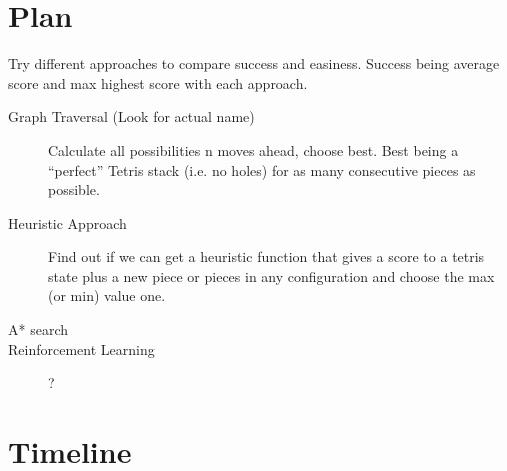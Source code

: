 \documentclass{article}
\begin{document}
\section{Plan}

Try different approaches to compare success and easiness. Success being average score and max highest score with each approach.

\begin{description}

  \item[Graph Traversal (Look for actual name)] Calculate all possibilities n moves ahead, choose best. Best being a ``perfect'' Tetris stack (i.e. no holes) for as many consecutive pieces as possible.

  \item[Heuristic Approach] Find out if we can get a heuristic function that gives a score to a tetris state plus a new piece or pieces in any configuration and choose the max (or min) value one.

  \item[A* search]

  \item[Reinforcement Learning]?

\end{description}


\section{Timeline}
\end{document}
